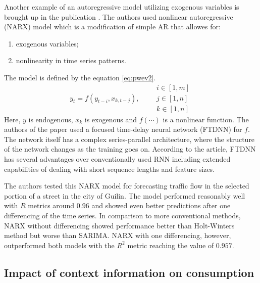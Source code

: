 \documentclass[3p,times,procedia]{elsarticle}
\begin{document}
Another example of an autoregressive model utilizing exogenous variables is brought up in the publication \cite{li2022nonlinear}. The authors used nonlinear autoregressive (NARX) model which is a modification of simple AR that allowes for:
\begin{enumerate}
	\item exogenous variables;
	\item nonlinearity in time series patterns.
\end{enumerate}
The model is defined by the equation \ref{eq:pwev2}.
\begin{equation} \label{eq:pwev2}
y_t = f(y_{t-i}, x_{k, t-j}), \qquad \begin{matrix}i \in [1, m] \\ j \in [1, n] \\ k \in [1, n] \end{matrix}
\end{equation}
Here, $y$ is endogenous, $x_k$ is exogenous and $f(\cdots)$ is a nonlinear function. The authors of the paper used a focused time-delay neural network (FTDNN) for $f$. The network itself has a complex series-parallel architecture, where the structure of the network changes as the training goes on. According to the article, FTDNN has several advantages over conventionally used RNN including extended capabilities of dealing with short sequence lengths and feature sizes.

The authors tested this NARX model for forecasting traffic flow in the selected portion of a street in the city of Guilin. The model performed reasonably well with $R$ metrics around $0.96$ and showed even better predictions after one differencing of the time series. In comparison to more conventional methods, NARX without differencing showed performance better than Holt-Winters method but worse than SARIMA. NARX with one differencing, however, outperformed both models with the $R^2$ metric reaching the value of $0.957$.

\subsection{Impact of context information on consumption} \label{icic}
\end{document}
